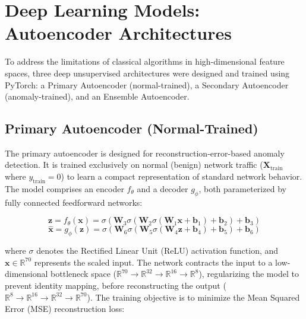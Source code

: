 
\section{Deep Learning Models: Autoencoder Architectures}

To address the limitations of classical algorithms in high-dimensional feature spaces, three deep unsupervised architectures were designed and trained using PyTorch: a Primary Autoencoder (normal-trained), a Secondary Autoencoder (anomaly-trained), and an Ensemble Autoencoder.

\subsection{Primary Autoencoder (Normal-Trained)}
The primary autoencoder is designed for reconstruction-error-based anomaly detection. It is trained exclusively on normal (benign) network traffic ($\mathbf{X}_{\text{train}}$ where $y_{\text{train}} = 0$) to learn a compact representation of standard network behavior. The model comprises an encoder $f_{\theta}$ and a decoder $g_{\phi}$, both parameterized by fully connected feedforward networks:

\begin{equation}
  \mathbf{z} = f_{\theta}(\mathbf{x}) = \sigma(\mathbf{W}_3 \sigma(\mathbf{W}_2 \sigma(\mathbf{W}_1 \mathbf{x} + \mathbf{b}_1) + \mathbf{b}_2) + \mathbf{b}_3)
\end{equation}
\begin{equation}
  \mathbf{\hat{x}} = g_{\phi}(\mathbf{z}) = \sigma(\mathbf{W}_6 \sigma(\mathbf{W}_5 \sigma(\mathbf{W}_4 \mathbf{z} + \mathbf{b}_4) + \mathbf{b}_5) + \mathbf{b}_6)
\end{equation}

where $\sigma$ denotes the Rectified Linear Unit (ReLU) activation function, and $\mathbf{x} \in \mathbb{R}^{70}$ represents the scaled input. The network contracts the input to a low-dimensional bottleneck space ($\mathbb{R}^{70} \to \mathbb{R}^{32} \to \mathbb{R}^{16} \to \mathbb{R}^8$), regularizing the model to prevent identity mapping, before reconstructing the output ($\mathbb{R}^8 \to \mathbb{R}^{16} \to \mathbb{R}^{32} \to \mathbb{R}^{70}$). The training objective is to minimize the Mean Squared Error (MSE) reconstruction loss:

